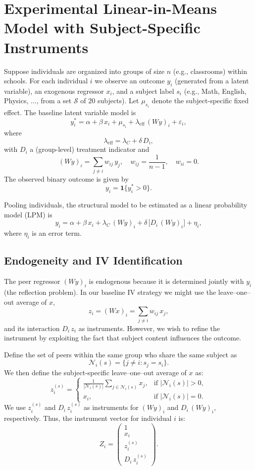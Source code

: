 \section{Experimental Linear-in-Means Model with Subject-Specific Instruments}

Suppose individuals are organized into groups of size \( n \) (e.g., classrooms) within schools. For each individual \( i \) we observe an outcome \( y_i \) (generated from a latent variable), an exogenous regressor \( x_i \), and a subject label \( s_i \) (e.g., Math, English, Physics, \(\dots\), from a set \(\mathcal{S}\) of 20 subjects). Let \( \mu_{s_i} \) denote the subject-specific fixed effect. The baseline latent variable model is
\[
y_i^* = \alpha + \beta\, x_i + \mu_{s_i} + \lambda_{\text{eff}} \, (Wy)_i + \varepsilon_i,
\]
where
\[
\lambda_{\text{eff}} = \lambda_C + \delta \, D_i,
\]
with \( D_i \) a (group-level) treatment indicator and
\[
(Wy)_i = \sum_{j\neq i} w_{ij}\, y_j, \quad w_{ij} = \frac{1}{n-1}, \quad w_{ii}=0.
\]
The observed binary outcome is given by
\[
y_i = \mathbf{1}\{ y_i^* > 0 \}.
\]

Pooling individuals, the structural model to be estimated as a linear probability model (LPM) is
\[
y_i = \alpha + \beta\, x_i + \lambda_C\,(Wy)_i + \delta\, \bigl[ D_i\,(Wy)_i \bigr] + \eta_i,
\]
where \(\eta_i\) is an error term.

\subsection*{Endogeneity and IV Identification}

The peer regressor \((Wy)_i\) is endogenous because it is determined jointly with \( y_i \) (the reflection problem). In our baseline IV strategy we might use the leave--one--out average of \(x\),
\[
z_i = (Wx)_i = \sum_{j \neq i} w_{ij}\, x_j,
\]
and its interaction \(D_i\, z_i\) as instruments. However, we wish to refine the instrument by exploiting the fact that subject content influences the outcome. 

Define the set of peers within the same group who share the same subject as
\[
\mathcal{N}_i(s) = \{ j \neq i : s_j = s_i \}.
\]
We then define the subject-specific leave--one--out average of \( x \) as:
\[
z_i^{(s)} = \begin{cases}
\displaystyle \frac{1}{|\mathcal{N}_i(s)|} \sum_{j\in \mathcal{N}_i(s)} x_j, & \text{if } |\mathcal{N}_i(s)| > 0, \\[1mm]
x_i, & \text{if } |\mathcal{N}_i(s)| = 0.
\end{cases}
\]
We use \( z_i^{(s)} \) and \( D_i\, z_i^{(s)} \) as instruments for \((Wy)_i\) and \(D_i\,(Wy)_i\), respectively. Thus, the instrument vector for individual \(i\) is:
\[
Z_i = \begin{pmatrix} 1 \\ x_i \\ z_i^{(s)} \\ D_i\, z_i^{(s)} \end{pmatrix}.
\]

